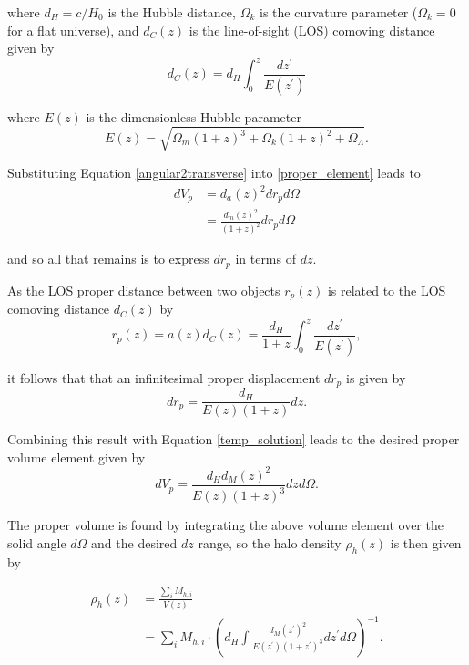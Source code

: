 \documentclass[%
 reprint,
 amsmath,amssymb,
 aps,nofootinbib
]{revtex4-1}
\begin{document}
\noindent where $d_H=c/H_0$ is the Hubble distance, $\Omega_k$ is the curvature parameter ($\Omega_k=0$ for a flat universe), and $d_C(z)$ is the line-of-sight (LOS) comoving distance given by
\begin{equation}\label{comoving_distance}
d_C(z)=d_H\int_0^z\frac{dz^\prime}{E(z^\prime)}
\end{equation}

\noindent where $E(z)$ is the dimensionless Hubble parameter
\begin{equation}\label{dim_hubble_parameter}
E(z)=\sqrt{\Omega_m(1+z)^3+\Omega_k(1+z)^2+\Omega_\Lambda}.
\end{equation}

\noindent Substituting Equation \eqref{angular2transverse} into \eqref{proper_element} leads to
\begin{align}\label{temp_solution}
dV_p&=d_a(z)^2dr_pd\Omega\nonumber\\
&=\frac{d_m(z)^2}{(1+z)^2}dr_pd\Omega
\end{align}

\noindent and so all that remains is to express $dr_p$ in terms of $dz$.

As the LOS proper distance between two objects $r_p(z)$ is related to the LOS comoving distance $d_C(z)$ by
\begin{equation}\label{physical2comoving}
r_p(z)=a(z)d_C(z)=\frac{d_H}{1+z}\int_0^z\frac{dz^\prime}{E(z^\prime)},
\end{equation}

\noindent it follows that that an infinitesimal proper displacement $dr_p$ is given by
\begin{equation}\label{physical2comoving_inf}
dr_p=\frac{d_H}{E(z)(1+z)}dz.
\end{equation}

\noindent Combining this result with Equation \eqref{temp_solution} leads to the desired proper volume element given by
\begin{equation}\label{pvolume_element}
dV_p=\frac{d_Hd_M(z)^2}{E(z)(1+z)^3}dzd\Omega.
\end{equation}

The proper volume is found by integrating the above volume element over the solid angle $d\Omega$ and the desired $dz$ range, so the halo density $\rho_h(z)$ is then given by

\begin{align}\label{rho_h}
\rho_h(z)&=\frac{\sum_i M_{h,i}}{V(z)}\nonumber\\
&=\sum_i M_{h,i}\cdot\left(d_H\int\frac{d_M(z^\prime)^2}{E(z^\prime)(1+z^\prime)^3}dz^\prime d\Omega\right)^{-1}.
\end{align}
\end{document}
